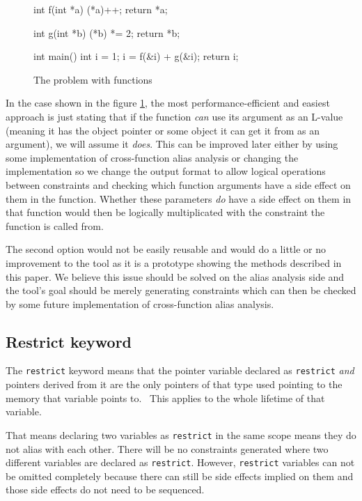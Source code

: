 \begin{figure}
\caption{The problem with functions}
\label{functions-source}
\begin{code}
int f(int *a){
    (*a)++;
    return *a;
}

int g(int *b){
    (*b) *= 2;
    return *b;
}

int main(){
    int i = 1;
    i = f(&i) + g(&i);
    return i;
}
\end{code}
\end{figure}

In the case shown in the figure \ref{functions-source}, the most performance-efficient and easiest approach is just stating that if the function \emph{can} use its argument as an L-value (meaning it has the object pointer or some object it can get it from as an argument), we will assume it \emph{does}. This can be improved later either by using some implementation of cross-function alias analysis or changing the implementation so we change the output format to allow logical operations between constraints and checking which function arguments have a side effect on them in the function. Whether these parameters \emph{do} have a side effect on them in that function would then be logically multiplicated with the constraint the function is called from.

The second option would not be easily reusable and would do a little or no improvement to the tool as it is a prototype showing the methods described in this paper. We believe this issue should be solved on the alias analysis side and the tool's goal should be merely generating constraints which can then be checked by some future implementation of cross-function alias analysis.

\subsection{Restrict keyword}
The \verb|restrict| keyword means that the pointer variable declared as \verb|restrict| \emph{and} pointers derived from it are the only pointers of that type used pointing to the memory that variable points to.~\cite{WG14N1570} This applies to the whole lifetime of that variable.

That means declaring two variables as \verb|restrict| in the same scope means they do not alias with each other.
There will be no constraints generated where two different variables are declared as \verb|restrict|.
However, \verb|restrict| variables can not be omitted completely because there can still be side effects
implied on them and those side effects do not need to be sequenced.

